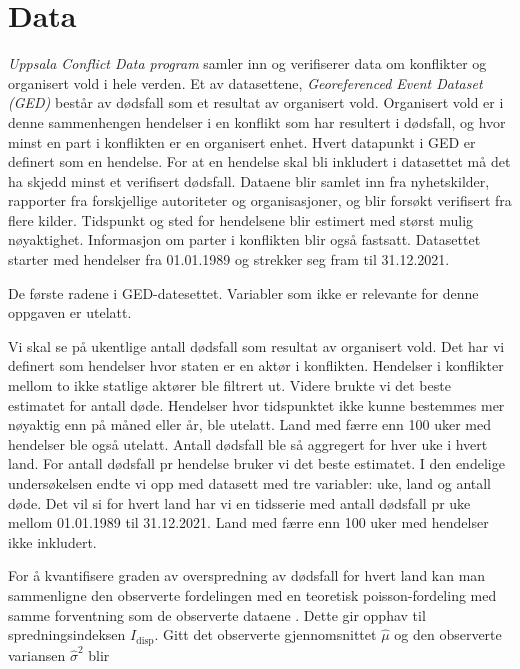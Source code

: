 \section{Data}

\textit{Uppsala Conflict Data program} samler inn og verifiserer data om
konflikter og organisert vold i hele verden. Et av datasettene,
\textit{Georeferenced Event Dataset (GED)} består av dødsfall som et resultat
av organisert vold. Organisert vold er i denne sammenhengen hendelser i en
konflikt som har resultert i dødsfall, og hvor minst en part i konflikten er en
organisert enhet. Hvert datapunkt i GED er definert som en hendelse. For at en
hendelse skal bli inkludert i datasettet må det ha skjedd minst et verifisert
dødsfall. Dataene blir samlet inn fra nyhetskilder, rapporter fra forskjellige
autoriteter og organisasjoner, og blir forsøkt verifisert fra flere kilder.
Tidspunkt og sted for hendelsene blir estimert med størst mulig nøyaktighet.
Informasjon om parter i konflikten blir også fastsatt. Datasettet starter med
hendelser fra 01.01.1989 og strekker seg fram til 31.12.2021. 


\begin{table}[!h]
\centering

\caption{De første radene i GED-datesettet. Variabler som ikke er relevante for
denne oppgaven er utelatt.}
\label{tab:GED_table}
\end{table}

Vi skal se på ukentlige antall dødsfall som resultat av organisert vold. Det
har vi definert som hendelser hvor staten er en aktør i konflikten. Hendelser i
konflikter mellom to ikke statlige aktører ble filtrert ut. Videre brukte vi
det beste estimatet for antall døde. Hendelser hvor tidspunktet ikke kunne
bestemmes mer nøyaktig enn på måned eller år, ble utelatt. Land med færre enn
100 uker med hendelser ble også utelatt. Antall dødsfall ble så aggregert for
hver uke i hvert land. For antall dødsfall pr hendelse bruker vi det beste
estimatet. I den endelige undersøkelsen endte vi opp med datasett med tre
variabler: uke, land og antall døde. Det vil si for hvert land har vi en
tidsserie med antall dødsfall pr uke mellom 01.01.1989 til 31.12.2021. Land med
færre enn 100 uker med hendelser ikke inkludert.

For å kvantifisere graden av overspredning av dødsfall for hvert land kan man
sammenligne den observerte fordelingen med en teoretisk poisson-fordeling med
samme forventning som de observerte dataene \parencite{weiss2018introduction}.
Dette gir opphav til  spredningsindeksen $I_{\mathrm{disp}}$. Gitt det
observerte gjennomsnittet $\hat{\mu}$ og den observerte variansen
$\hat{\sigma}^2$ blir 

